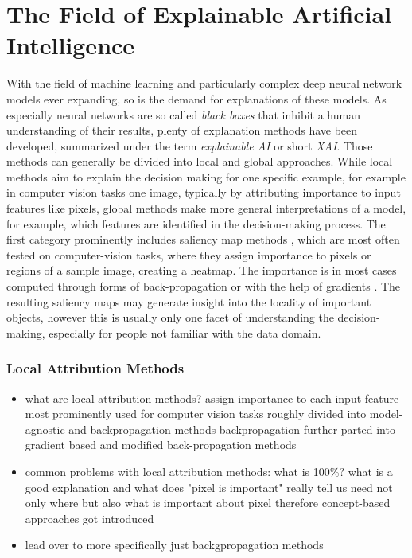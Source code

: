 \section{The Field of Explainable Artificial Intelligence}
With the field of machine learning and particularly complex deep neural network models ever expanding, so is the demand for explanations of these models.
As especially neural networks are so called \textit{black boxes} that inhibit a human understanding of their results, plenty of explanation methods have been developed, summarized under the term \textit{explainable AI} or short \textit{XAI}. 
Those methods can generally be divided into local and global approaches. While local methods aim to explain the decision making for one specific example, for example in computer vision tasks one image, typically by attributing importance to input features like pixels, global methods make more general interpretations of a model, for example, which features are identified in the decision-making process. The first category prominently includes saliency map methods , which are most often tested on computer-vision tasks, where they assign importance to pixels or regions of a sample image, creating a heatmap. The importance is in most cases computed through forms of back-propagation  or with the help of gradients . The resulting saliency maps may generate insight into the locality of important objects, however this is usually only one facet of understanding the decision-making, especially for people not familiar with the data domain.

\subsubsection{Local Attribution Methods}
\begin{itemize}
    \item what are local attribution methods?
    assign importance to each input feature
    most prominently used for computer vision tasks
    roughly divided into model-agnostic and backpropagation methods
    backpropagation further parted into gradient based and modified back-propagation methods
    \item common problems with local attribution methods: what is 100\%?
    what is a good explanation and what does "pixel is important" really tell us
    need not only where but also what is important about pixel
    therefore concept-based approaches got introduced
    \item lead over to more specifically just backgpropagation methods
\end{itemize}


